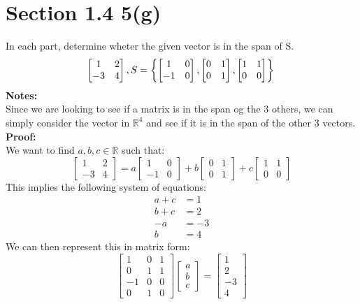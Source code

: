 \documentclass{article}
\begin{document}
\section*{Section 1.4 5(g)}
In each part, determine wheter the given vector is in the span of S.
$$ \begin{bmatrix}
    1 & 2 \\
    -3 & 4
\end{bmatrix}, S = \left\{ \begin{bmatrix}
    1 & 0 \\
    -1 & 0
\end{bmatrix}, \begin{bmatrix}
    0 & 1 \\
    0 & 1
\end{bmatrix}, \begin{bmatrix}
    1 & 1 \\
    0 & 0
\end{bmatrix}
\right\}\\
$$
\textbf{Notes:} \\
Since we are looking to see if a matrix is in the span og the 3 others, we can simply consider the vector in $\mathds{R}^4$ and see if it is in the span of the other 3 vectors.\\
\textbf{Proof:}\\
We want to find $a,b,c \in \mathds{R}$ such that:
$$ \begin{bmatrix}
    1 & 2 \\
    -3 & 4
\end{bmatrix} = a\begin{bmatrix}
    1 & 0 \\
    -1 & 0
\end{bmatrix} + b\begin{bmatrix}
    0 & 1 \\
    0 & 1
\end{bmatrix} + c\begin{bmatrix}
    1 & 1 \\
    0 & 0
\end{bmatrix} $$
This implies the following system of equations:
\begin{align*}
    a + c &= 1\\
    b + c &= 2\\
    -a &= -3\\
    b &= 4
\end{align*}
We can then represent this in matrix form: 
$$ \begin{bmatrix} 
    1 & 0 & 1 \\ 
    0 & 1 & 1 \\ 
    -1 & 0 & 0 \\ 
    0 & 1 & 0 
\end{bmatrix} \begin{bmatrix} 
    a \\ b \\ c 
\end{bmatrix} = 
\begin{bmatrix} 
    1 \\ 2 \\ -3 \\ 4 
\end{bmatrix} $$
\end{document}
